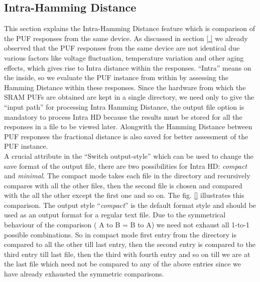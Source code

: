 \subsection{Intra-Hamming Distance}
\label{intra_hd_section}
This section explains the Intra-Hamming Distance feature which is comparison of the PUF responses from the same device. As discussed in section \ref{ } we already observed that the PUF responses from the same device are not identical due various factors like voltage fluctuation,  temperature variation and other aging effects, which gives rise to Intra distance within the responses. ``Intra'' means on the inside, so we evaluate the PUF instance from within by assessing the Hamming Distance within
these responses. Since the hardware from which the SRAM PUFs are obtained are kept in a single directory, we need only to give the ``input path'' for processing Intra Hamming Distance, the output file option is mandatory to process Intra HD because the results must be stored for all the responses in a file to be viewed later. Alongwith the Hamming Distance between PUF responses the fractional distance is also saved for better assessment of the PUF instance.\\

A crucial attribute in the ``Switch output-style'' which can be used to change the save format of the output file, there are two possibilities for Intra HD: \emph{compact} and \emph{minimal}. The compact mode takes each file in the directory and recursively compares with all the other files, then the second file is chosen and compared with the all the other except the first one and so on. The fig. \ref{} illustrates this comparison.  The output style ``\emph{compact}'' is the default format style and should be used
as an output format for a regular text file. Due to the symmetrical behaviour of the comparison ( A to B = B to A) we need not exhaust all 1-to-1 possible combinations. So in compact mode first entry from the directory is compared to all the other till last entry, then the second entry is compared to the third entry till last file, then the third with fourth entry and so on till we are at the last file which need not be compared to any of the above entries since we have already exhausted the
symmetric comparisons.\\

